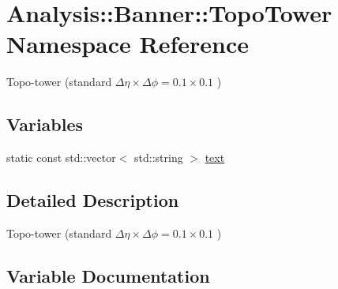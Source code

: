 \hypertarget{namespaceAnalysis_1_1Banner_1_1TopoTower}{}\section{Analysis\+:\+:Banner\+:\+:Topo\+Tower Namespace Reference}
\label{namespaceAnalysis_1_1Banner_1_1TopoTower}


Topo-\/tower (standard $ \Delta\eta\times\Delta\phi = 0.1\times 0.1 $ )  


\subsection*{Variables}
\begin{DoxyCompactItemize}
\item 
static const std\+::vector$<$ std\+::string $>$ \hyperlink{namespaceAnalysis_1_1Banner_1_1TopoTower_aa34a322d74236067c435f60c9bd76847}{text}
\end{DoxyCompactItemize}


\subsection{Detailed Description}
Topo-\/tower (standard $ \Delta\eta\times\Delta\phi = 0.1\times 0.1 $ ) 

\subsection{Variable Documentation}
